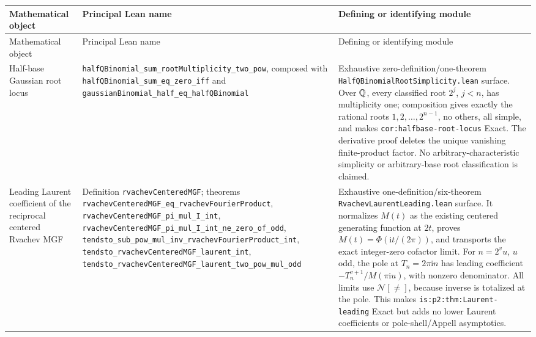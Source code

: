 \documentclass[11pt,oneside]{article}
\theoremstyle{definition}
\theoremstyle{remark}
\begin{document}
\footnotesize
\begin{longtable}{@{}>{\raggedright\arraybackslash}p{} >{\raggedright\arraybackslash}p{} >{\raggedright\arraybackslash}p{}@{}}
\toprule
Mathematical object & Principal Lean name & Defining or identifying module \\
\midrule
\endfirsthead
\toprule
Mathematical object & Principal Lean name & Defining or identifying module \\
\midrule
\endhead
Half-base Gaussian root locus & \nolinkurl{halfQBinomial_sum_rootMultiplicity_two_pow}, composed with \nolinkurl{halfQBinomial_sum_eq_zero_iff} and \nolinkurl{gaussianBinomial_half_eq_halfQBinomial} & Exhaustive zero-definition/one-theorem \nolinkurl{HalfQBinomialRootSimplicity.lean} surface.  Over \(\mathbb{Q}\), every classified root \(2^j\), \(j<n\), has multiplicity one; composition gives exactly the rational roots \(1,2,\ldots,2^{n-1}\), no others, all simple, and makes \nolinkurl{cor:halfbase-root-locus} Exact.  The derivative proof deletes the unique vanishing finite-product factor.  No arbitrary-characteristic simplicity or arbitrary-base root classification is claimed. \\
Leading Laurent coefficient of the reciprocal centered Rvachev MGF & Definition \nolinkurl{rvachevCenteredMGF}; theorems \nolinkurl{rvachevCenteredMGF_eq_rvachevFourierProduct}, \nolinkurl{rvachevCenteredMGF_pi_mul_I_int}, \nolinkurl{rvachevCenteredMGF_pi_mul_I_int_ne_zero_of_odd}, \nolinkurl{tendsto_sub_pow_mul_inv_rvachevFourierProduct_int}, \nolinkurl{tendsto_rvachevCenteredMGF_laurent_int}, \nolinkurl{tendsto_rvachevCenteredMGF_laurent_two_pow_mul_odd} & Exhaustive one-definition/six-theorem \nolinkurl{RvachevLaurentLeading.lean} surface.  It normalizes \(M(t)\) as the existing centered generating function at \(2t\), proves \(M(t)=\Phi(\mathrm i t/(2\pi))\), and transports the exact integer-zero cofactor limit.  For \(n=2^v u\), \(u\) odd, the pole at \(T_n=2\pi\mathrm i n\) has leading coefficient \(-T_n^{v+1}/M(\pi\mathrm i u)\), with nonzero denominator.  All limits use \(\mathcal N[\ne]\), because inverse is totalized at the pole.  This makes \nolinkurl{is:p2:thm:Laurent-leading} Exact but adds no lower Laurent coefficients or pole-shell/Appell asymptotics. \\

\end{longtable}
\end{document}

